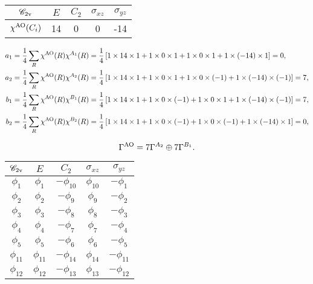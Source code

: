 \documentclass[a4paper]{book}
\newcommand{\AO}{{\rm AO}}
\begin{document}
\begin{solution}
\begin{enumerate}[label=(\alph*)]
		
		\begin{center}
		\begin{tabular}{ccccc}\hline
	$\mathscr{C}_{\rm 2v}$	& $E$ & $C_2$ &	$\sigma_{xz}$	& $\sigma_{yz}$ \\ \hline
	$\chi^{\AO}(C_i)$	&	14	&	0	&	0	&	-14	\\ \hline
		\end{tabular}
		\end{center}
		
		\begin{align*}
		a_1 &= \frac{1}{4} \sum_{R} \chi^{\AO}(R) \chi^{A_1}(R) = \frac{1}{4} \left[ 1 \times 14 \times 1 + 1 \times 0 \times 1 + 1 \times 0 \times 1 + 1 \times (-14) \times 1 \right] = 0, \\		
		a_2 &= \frac{1}{4} \sum_{R} \chi^{\AO}(R) \chi^{A_2}(R) = \frac{1}{4} \left[ 1 \times 14 \times 1 + 1 \times 0 \times 1 + 1 \times 0 \times (-1) + 1 \times (-14) \times (-1) \right] = 7, \\
		b_1 &= \frac{1}{4} \sum_{R} \chi^{\AO}(R) \chi^{B_1}(R) = \frac{1}{4} \left[ 1 \times 14 \times 1 + 1 \times 0 \times (-1) + 1 \times 0 \times 1 + 1 \times (-14) \times (-1) \right] = 7, \\
		b_2 &= \frac{1}{4} \sum_{R} \chi^{\AO}(R) \chi^{B_2}(R) = \frac{1}{4} \left[ 1 \times 14 \times 1 + 1 \times 0 \times (-1) + 1 \times 0 \times (-1) + 1 \times (-14) \times 1 \right] = 0, \\
		\end{align*}
		
		\begin{equation*}
			\Gamma^{\AO} = 7\Gamma^{A_2} \oplus 7\Gamma^{B_1}.
		\end{equation*}
		
		\begin{center}
		\begin{tabular}{ccccc}\hline
	$\mathscr{C}_{\rm 2v}$ & $E$ & $C_2$ &	$\sigma_{xz}$	& $\sigma_{yz}$	\\ \hline
			$\phi_1$	&	$\phi_1$	&	$-\phi_{10}$	&	$\phi_{10}$	&	$-\phi_1$	\\
			$\phi_2$	&	$\phi_2$	&	$-\phi_9$	&	$\phi_9$	&	$-\phi_2$		\\
			$\phi_3$	&	$\phi_3$	&	$-\phi_8$	&	$\phi_8$	&	$-\phi_3$		\\
			$\phi_4$	&	$\phi_4$	&	$-\phi_7$	&	$\phi_7$	&	$-\phi_4$		\\ 
			$\phi_5$	&	$\phi_5$	&	$-\phi_6$	&	$\phi_6$	&	$-\phi_5$		\\ 
			$\phi_{11}$	&	$\phi_{11}$	&	$-\phi_{14}$	&	$\phi_{14}$	&	$-\phi_{11}$		\\
			$\phi_{12}$	&	$\phi_{12}$	&	$-\phi_{13}$	&	$\phi_{13}$	&	$-\phi_{12}$		\\ \hline
		\end{tabular}
		\end{center}
		
		\end{enumerate}				
		
	\end{solution}
\end{document}
